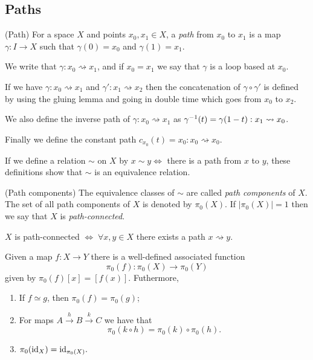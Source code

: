 \documentclass{article}
\begin{document}
\subsection{Paths}
\begin{definition}
	(Path) For a space $ X $ and points $ x_0,x_1\in X $, a \textit{path} from $ x_0 $ to $ x_1 $ is a map $ \gamma:I \to X $ such that $ \gamma(0) = x_0 $ and $ \gamma(1) = x_1 $. 
\end{definition}
We write that $ \gamma: x_0 \rightsquigarrow x_1 $, and if $ x_0 =x_1 $ we say that $ \gamma $ is a loop based at $ x_0 $.\par
If we have $ \gamma:x_0 \rightsquigarrow x_1 $ and $ \gamma':x_1\rightsquigarrow x_2 $ then the concatenation of $ \gamma\circ \gamma' $ is defined by using the gluing lemma and going in double time which goes from $ x_0 $ to $ x_2 $.\par
We also define the inverse path of $ \gamma: x_0\rightsquigarrow x_1 $ as $ {\gamma}^{-1}(t) = \gamma(1-t): x_1\rightsquigarrow x_0 $.\par
Finally we define the constant path $ c_{x_0}(t) = x_0: x_0\rightsquigarrow x_0 $.\par
If we define a relation $ \sim $ on $ X $ by $ x\sim y \iff $ there is a path from $ x $ to $ y $, these definitions show that $ \sim $ is an equivalence relation.
\begin{definition}
	(Path components) The equivalence classes of $ \sim $ are called \textit{path components} of $ X $. The set of all path components of $ X $ is denoted by $ \pi_0(X) $. If $ |\pi_0(X)| = 1 $ then we say that $ X $ is \textit{path-connected}.
\end{definition}
\begin{remark}
  $ X $ is path-connected $ \iff\; \forall x,y\in X $ there exists a path $ x\rightsquigarrow y $.
\end{remark}
\begin{proposition}
  Given a map $ f:X\to Y $ there is a well-defined associated function 
  \[
    \pi_0(f): \pi_0(X) \to \pi_0(Y)
  \]
  given by $ \pi_0(f)[x] = [f(x)] $. Futhermore,
  \begin{enumerate}
	  \item If $ f\simeq g $, then $ \pi_0(f) = \pi_0(g) $;
	  \item For maps $ A \overset h\rightarrow B \overset k\rightarrow C $ we have that 
		  \[
		    \pi_0(k\circ h) = \pi_0(k) \circ \pi_0(h).
		  \]
	  \item $ \pi_0(\mathrm{id}_X) = \mathrm{id}_{\pi_0(X)} .$
  \end{enumerate}
\end{proposition}
\end{document}
